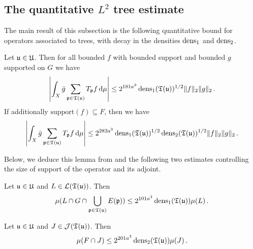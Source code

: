 \subsection{The quantitative \texorpdfstring{$L^2$}{L2} tree estimate}

The main result of this subsection is the following quantitative bound for operators associated to trees, with decay in the densities $\operatorname{\operatorname{dens}}_1$ and $\operatorname{\operatorname{dens}}_2$.

\begin{lemma}
    \label{densities-tree-bound}
    \leanok
    Let ${\mathfrak u} \in {\mathfrak U}$. Then for all bounded $f$ with bounded support and bounded $g$ supported on $G$ we have
    \begin{equation}
        \label{eq-cor-tree-est}
        \left|\int_X \bar g \sum_{{\mathfrak p} \in {\mathfrak T}({\mathfrak u})} T_{{\mathfrak p} }f \, \mathrm{d}\mu \right| \le 2^{181a^3} \operatorname{\operatorname{dens}}_1({\mathfrak T}({\mathfrak u}))^{1/2} \|f\|_2\|g\|_2\,.
    \end{equation}
    If additionally $\text{support}(f) \subseteq F$, then we have
    \begin{equation}
        \label{eq-cor-tree-est-F}
        \left| \int_X \bar g \sum_{{\mathfrak p} \in {\mathfrak T}({\mathfrak u})} T_{{\mathfrak p} }f\, \mathrm{d}\mu \right| \le 2^{282a^3} \operatorname{\operatorname{dens}}_1({\mathfrak T}({\mathfrak u}))^{1/2} \operatorname{\operatorname{dens}}_2({\mathfrak T}({\mathfrak u}))^{1/2} \|f\|_2\|g\|_2\,.
    \end{equation}
\end{lemma}

Below, we deduce this lemma from  and the following two estimates controlling the size of support of the operator and its adjoint.

\begin{lemma}
    \label{local-dens1-tree-bound}
    \leanok
    Let ${\mathfrak u} \in {\mathfrak U}$ and $L \in \mathcal{L}({\mathfrak T}({\mathfrak u}))$. Then
    \begin{equation}
    \label{eq-1density-estimate-tree}
        \mu(L \cap G \cap \bigcup_{{\mathfrak p} \in {\mathfrak T}({\mathfrak u})} E({\mathfrak p})) \le 2^{101a^3} \operatorname{\operatorname{dens}}_1({\mathfrak T}({\mathfrak u})) \mu(L)\,.
    \end{equation}
\end{lemma}

\begin{lemma}
    \label{local-dens2-tree-bound}
    \leanok
    Let ${\mathfrak u} \in {\mathfrak U}$ and $J \in \mathcal{J}({\mathfrak T}({\mathfrak u}))$. Then
    $$
        \mu(F \cap J) \le 2^{201a^3} \operatorname{\operatorname{dens}}_2({\mathfrak T}({\mathfrak u})) \mu(J)\,.
    $$
\end{lemma}

